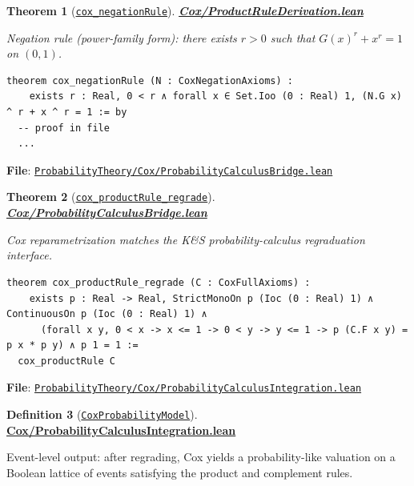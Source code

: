 \documentclass[11pt]{article}
\newtheorem{theorem}{Theorem}[section]
\theoremstyle{definition}
\newtheorem{definition}[theorem]{Definition}
\theoremstyle{remark}
\begin{document}
\begin{theorem}[\href{https://github.com/zariuq/ks-foundations-of-inference/blob/main/ProbabilityTheory/Cox/ProductRuleDerivation.lean}{\texttt{cox\_negationRule}}]
\textbf{\href{https://github.com/zariuq/ks-foundations-of-inference/blob/main/ProbabilityTheory/Cox/ProductRuleDerivation.lean}{Cox/ProductRuleDerivation.lean}}

Negation rule (power-family form): there exists $r>0$ such that $G(x)^r + x^r = 1$ on $(0,1)$.
\end{theorem}

\begin{lstlisting}[caption={Cox negation rule: power-family form}]
theorem cox_negationRule (N : CoxNegationAxioms) :
    exists r : Real, 0 < r ∧ forall x ∈ Set.Ioo (0 : Real) 1, (N.G x) ^ r + x ^ r = 1 := by
  -- proof in file
  ...
\end{lstlisting}

\textbf{File}: \href{https://github.com/zariuq/ks-foundations-of-inference/blob/main/ProbabilityTheory/Cox/ProbabilityCalculusBridge.lean}{\texttt{ProbabilityTheory/Cox/ProbabilityCalculusBridge.lean}}

\begin{theorem}[\href{https://github.com/zariuq/ks-foundations-of-inference/blob/main/ProbabilityTheory/Cox/ProbabilityCalculusBridge.lean}{\texttt{cox\_productRule\_regrade}}]
\textbf{\href{https://github.com/zariuq/ks-foundations-of-inference/blob/main/ProbabilityTheory/Cox/ProbabilityCalculusBridge.lean}{Cox/ProbabilityCalculusBridge.lean}}

Cox reparametrization matches the K\&S probability-calculus regraduation interface.
\end{theorem}

\begin{lstlisting}[caption={Bridge: Cox product rule as a K\&S-style regrade}]
theorem cox_productRule_regrade (C : CoxFullAxioms) :
    exists p : Real -> Real, StrictMonoOn p (Ioc (0 : Real) 1) ∧ ContinuousOn p (Ioc (0 : Real) 1) ∧
      (forall x y, 0 < x -> x <= 1 -> 0 < y -> y <= 1 -> p (C.F x y) = p x * p y) ∧ p 1 = 1 :=
  cox_productRule C
\end{lstlisting}

\textbf{File}: \href{https://github.com/zariuq/ks-foundations-of-inference/blob/main/ProbabilityTheory/Cox/ProbabilityCalculusIntegration.lean}{\texttt{ProbabilityTheory/Cox/ProbabilityCalculusIntegration.lean}}

\begin{definition}[\href{https://github.com/zariuq/ks-foundations-of-inference/blob/main/ProbabilityTheory/Cox/ProbabilityCalculusIntegration.lean}{\texttt{CoxProbabilityModel}}]
\textbf{\href{https://github.com/zariuq/ks-foundations-of-inference/blob/main/ProbabilityTheory/Cox/ProbabilityCalculusIntegration.lean}{Cox/ProbabilityCalculusIntegration.lean}}

Event-level output: after regrading, Cox yields a probability-like valuation on a Boolean lattice of events
satisfying the product and complement rules.
\end{definition}
\end{document}
